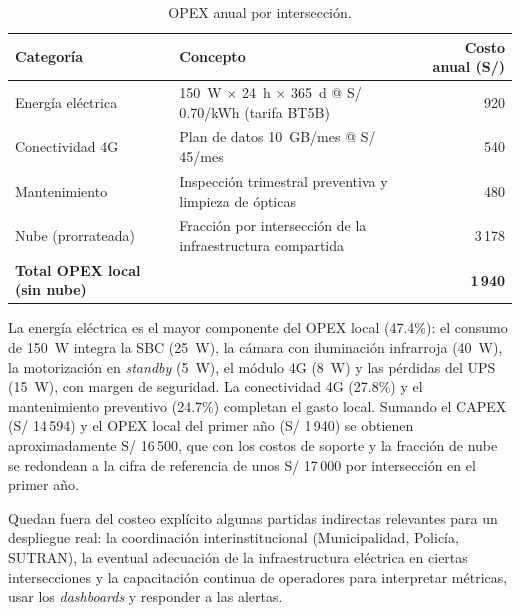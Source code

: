 \begin{table}[H]
  \centering
  \footnotesize
  \caption{OPEX anual por intersección.}
  \label{tab:opex}
  \begin{tabularx}{\linewidth}{@{}X X r@{}}
    \toprule
    \textbf{Categoría} & \textbf{Concepto} & \textbf{Costo anual (S/)}\\
    \midrule
    Energía eléctrica & 150~W $\times$ 24~h $\times$ 365~d @ S/ 0.70/kWh (tarifa BT5B) & 920\\
    Conectividad 4G & Plan de datos 10~GB/mes @ S/ 45/mes & 540\\
    Mantenimiento & Inspección trimestral preventiva y limpieza de ópticas & 480\\
    Nube (prorrateada) & Fracción por intersección de la infraestructura compartida & 3\,178\\
    \midrule
    \textbf{Total OPEX local (sin nube)} & & \textbf{1\,940}\\
    \bottomrule
  \end{tabularx}
\end{table}

La energía eléctrica es el mayor componente del OPEX local (47.4\%): el consumo de 150~W
integra la SBC (25~W), la cámara con iluminación infrarroja (40~W), la motorización en
\emph{standby} (5~W), el módulo 4G (8~W) y las pérdidas del UPS (15~W), con margen de
seguridad. La conectividad 4G (27.8\%) y el mantenimiento preventivo (24.7\%) completan el
gasto local. Sumando el CAPEX (S/ 14\,594) y el OPEX local del primer año (S/ 1\,940) se
obtienen aproximadamente S/ 16\,500, que con los costos de soporte y la fracción de nube se
redondean a la cifra de referencia de unos S/ 17\,000 por intersección en el primer año.

Quedan fuera del costeo explícito algunas partidas indirectas relevantes para un despliegue
real: la coordinación interinstitucional (Municipalidad, Policía, SUTRAN), la eventual
adecuación de la infraestructura eléctrica en ciertas intersecciones y la capacitación
continua de operadores para interpretar métricas, usar los \emph{dashboards} y responder a las
alertas.
